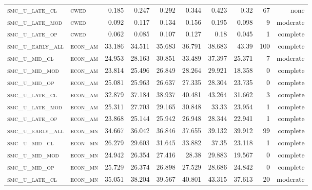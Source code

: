 \begin{landscape}
\begin{center}
\begin{footnotesize}
\begin{longtable}{llrrrrr|rrr}
\textsc{smc\_u\_late\_cl  } & \textsc{cwed      }   & 0.185    & 0.247    & 0.292    & 0.344    & 0.423    & 0.32     & 67  & none     \\
\textsc{smc\_u\_late\_mod } & \textsc{cwed      }   & 0.092    & 0.117    & 0.134    & 0.156    & 0.195    & 0.098    & 9   & moderate \\
\textsc{smc\_u\_late\_op  } & \textsc{cwed      }   & 0.062    & 0.085    & 0.107    & 0.127    & 0.18     & 0.045    & 1   & complete \\
\textsc{smc\_u\_early\_all} & \textsc{econ\_am  }   & 33.186   & 34.511   & 35.683   & 36.791   & 38.683   & 43.39    & 100 & complete \\
\textsc{smc\_u\_mid\_cl   } & \textsc{econ\_am  }   & 24.953   & 28.163   & 30.851   & 33.489   & 37.397   & 25.371   & 7   & moderate \\
\textsc{smc\_u\_mid\_mod  } & \textsc{econ\_am  }   & 23.814   & 25.496   & 26.849   & 28.264   & 29.921   & 18.358   & 0   & complete \\
\textsc{smc\_u\_mid\_op   } & \textsc{econ\_am  }   & 25.081   & 25.963   & 26.637   & 27.335   & 28.304   & 23.735   & 0   & complete \\
\textsc{smc\_u\_late\_cl  } & \textsc{econ\_am  }   & 32.879   & 37.184   & 38.937   & 40.481   & 43.264   & 31.662   & 3   & complete \\
\textsc{smc\_u\_late\_mod } & \textsc{econ\_am  }   & 25.311   & 27.703   & 29.165   & 30.848   & 33.33    & 23.954   & 1   & complete \\
\textsc{smc\_u\_late\_op  } & \textsc{econ\_am  }   & 23.868   & 25.144   & 25.942   & 26.948   & 28.344   & 22.941   & 1   & complete \\
\textsc{smc\_u\_early\_all} & \textsc{econ\_mn  }   & 34.667   & 36.042   & 36.846   & 37.655   & 39.132   & 39.912   & 99  & complete \\
\textsc{smc\_u\_mid\_cl   } & \textsc{econ\_mn  }   & 26.279   & 29.603   & 31.645   & 33.882   & 37.35    & 23.118   & 1   & complete \\
\textsc{smc\_u\_mid\_mod  } & \textsc{econ\_mn  }   & 24.942   & 26.354   & 27.416   & 28.38    & 29.883   & 19.567   & 0   & complete \\
\textsc{smc\_u\_mid\_op   } & \textsc{econ\_mn  }   & 25.729   & 26.374   & 26.898   & 27.529   & 28.686   & 24.842   & 0   & complete \\
\textsc{smc\_u\_late\_cl  } & \textsc{econ\_mn  }   & 35.051   & 38.204   & 39.567   & 40.801   & 43.315   & 37.613   & 20  & moderate \\

\end{longtable}
\end{footnotesize}
\end{center}
\end{landscape}
